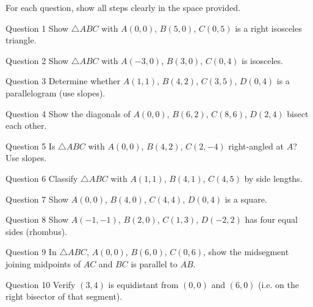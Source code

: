 \documentclass[11pt]{article}
\begin{document}
\clearpage
{}
For each question, show all steps clearly in the space provided.

\begin{qbox}{Question 1}
Show $\triangle ABC$ with $A(0,0)$, $B(5,0)$, $C(0,5)$ is a right isosceles triangle.\workspace{2.8cm}
\end{qbox}

\begin{qbox}{Question 2}
Show $\triangle ABC$ with $A(-3,0)$, $B(3,0)$, $C(0,4)$ is isosceles.\workspace{2.6cm}
\end{qbox}

\begin{qbox}{Question 3}
Determine whether $A(1,1)$, $B(4,2)$, $C(3,5)$, $D(0,4)$ is a parallelogram (use slopes).\workspace{2.8cm}
\end{qbox}

\begin{qbox}{Question 4}
Show the diagonals of $A(0,0)$, $B(6,2)$, $C(8,6)$, $D(2,4)$ bisect each other.\workspace{2.8cm}
\end{qbox}

\begin{qbox}{Question 5}
Is $\triangle ABC$ with $A(0,0)$, $B(4,2)$, $C(2,-4)$ right-angled at $A$? Use slopes.\workspace{2.8cm}
\end{qbox}

\begin{qbox}{Question 6}
Classify $\triangle ABC$ with $A(1,1)$, $B(4,1)$, $C(4,5)$ by side lengths.\workspace{2.6cm}
\end{qbox}

\begin{qbox}{Question 7}
Show $A(0,0)$, $B(4,0)$, $C(4,4)$, $D(0,4)$ is a square.\workspace{2.6cm}
\end{qbox}

\begin{qbox}{Question 8}
Show $A(-1,-1)$, $B(2,0)$, $C(1,3)$, $D(-2,2)$ has four equal sides (rhombus).\workspace{2.8cm}
\end{qbox}

\begin{qbox}{Question 9}
In $\triangle ABC$, $A(0,0)$, $B(6,0)$, $C(0,6)$, show the midsegment joining midpoints of $AC$ and $BC$ is parallel to $AB$.\workspace{3.0cm}
\end{qbox}

\begin{qbox}{Question 10}
Verify $(3,4)$ is equidistant from $(0,0)$ and $(6,0)$ (i.e. on the right bisector of that segment).\workspace{2.6cm}
\end{qbox}
\end{document}
